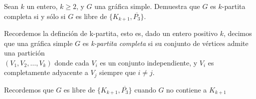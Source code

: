 Sean $k$ un entero, $k \ge 2$, y $G$ una gráfica simple. Demuestra que $G$
es $k$-partita completa si y sólo si $G$ es libre de $\{K _{k+1}, \overline{P_3}\}$.

Recordemos la definción de k-partita, esto es, dado un entero positivo $k$, decimos que una gráfica simple $G$ es \textit{k-partita completa} si su conjunto de vértices admite una partición \\$(V_1, V_2,\dots, V_k)$ donde cada $V_i$ es un conjunto independiente, y $V_i$ es completamente adyacente a $V_j$ siempre que $i \neq j$.

Recordemos que $G$ es libre de $\{K _{k+1}, \overline{P_3}\}$ cuando $G$ no contiene a $K _{k+1}$